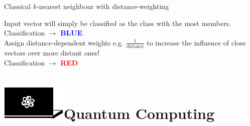 \documentclass[10pt]{beamer}
\begin{document}
{\begin{frame}[fragile]{Classical $k$-nearest neighbour with distance-weighting}
\begin{minipage}[c]{0.49\textwidth}
\end{minipage}%
\begin{minipage}[c]{0.49\textwidth}
Input vector will simply be classified as the class with the most members.\\
Classification $\rightarrow$ \textbf{\textcolor{blue}{BLUE}}\\
\vspace{0.1cm}
Assign distance-dependent weights e.g. $\frac{1}{\mathrm{distance}}$ to increase the influence of close vectors over more distant ones!\\
Classification $\rightarrow$ \textbf{\textcolor{red}{RED}}\\
\end{minipage}


\end{frame}
}


\section{\protect\includegraphics[scale=2.4]{Vectors/laptop_q.eps}\newline Quantum Computing}
\end{document}
